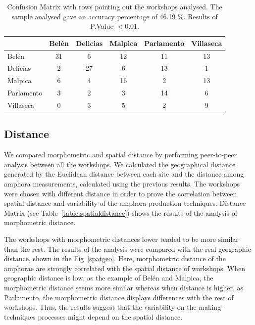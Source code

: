 \documentclass[review]{elsarticle}
\begin{document}
\begin{table}[htp]
\begin{tabular}{lccccc}
\hline
      & Bel\'en & Delicias & Malpica & Parlamento & Villaseca\\ \hline
Bel\'en &   31  &      6   &   12    &     11     &   13 \\
Delicias&  2  &     27   &    6    &     13     &    1  \\
Malpica &  6  &      4   &   16    &      2     &   13   \\
Parlamento & 3&      2   &   3     &      14    &    6    \\
Villaseca  & 0&      3   &    5    &      2     &    9     \\
\hline

\end{tabular}
\caption{Confusion Matrix with rows pointing out the workshops analysed. The sample analysed gave an accuracy percentage of 46.19 $\%$. Results of P.Value $<$0.01. }
\label{table:confusion}
\end{table}

\subsection{Distance}

We compared morphometric and spatial distance by performing peer-to-peer analysis between all the workshops. We calculated the geographical distance generated by the Euclidean distance between each site and the distance among amphora measurements, calculated using the previous results. The workshops were chosen with different distance in order to prove the correlation between spatial distance and variability of the amphora production techniques. Distance Matrix (see Table~\ref{table:spatialdistance}) shows the results of the analysis of morphometric distance. 


The workshops with morphometric distances lower tended to be more similar than the rest. The results of the analysis were compared with the real geographic distance, shown in the Fig~\ref{spatgeo}. Here, morphometric distance of the amphorae are strongly correlated with the spatial distance of workshops. When geographic distance is low, as the example of Bel\'en and Malpica, the morphometric distance seems more similar whereas when distance is higher, as Parlamento, the morphometric distance displays differences with the rest of workshops. Thus, the results suggest that the variability on the making-techniques processes might depend on the spatial distance.  
\end{document}
